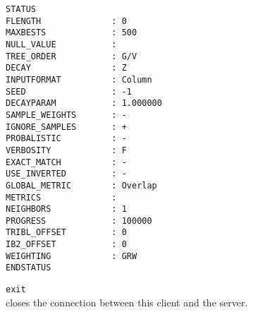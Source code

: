 \documentclass{report}
\begin{document}
\begin{description}
\begin{footnotesize}
\begin{verbatim}
STATUS
FLENGTH              : 0
MAXBESTS             : 500
NULL_VALUE           : 
TREE_ORDER           : G/V
DECAY                : Z
INPUTFORMAT          : Column
SEED                 : -1
DECAYPARAM           : 1.000000
SAMPLE_WEIGHTS       : -
IGNORE_SAMPLES       : +
PROBALISTIC          : -
VERBOSITY            : F
EXACT_MATCH          : -
USE_INVERTED         : -
GLOBAL_METRIC        : Overlap
METRICS              : 
NEIGHBORS            : 1
PROGRESS             : 100000
TRIBL_OFFSET         : 0
IB2_OFFSET           : 0
WEIGHTING            : GRW
ENDSTATUS
\end{verbatim}
\end{footnotesize}

\item {\tt exit}\\
  closes the connection between this client and the server.
\end{description}

\clearpage



\end{document}
